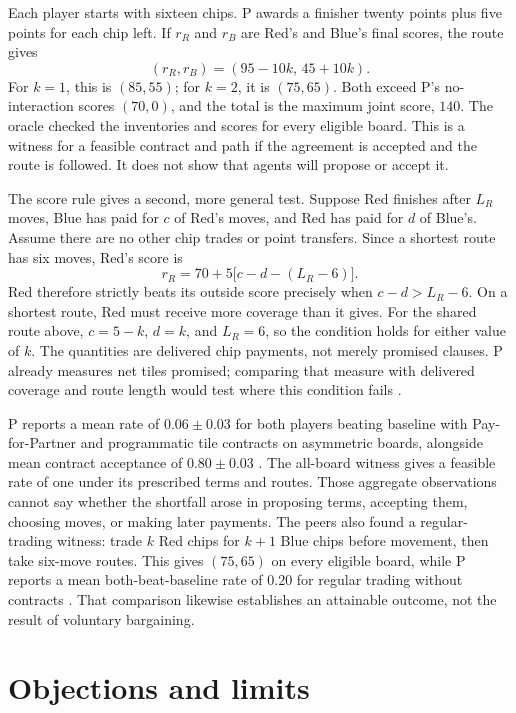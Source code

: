 \documentclass{article}
\begin{document}
Each player starts with sixteen chips. P awards a finisher twenty points plus five points for each
chip left. If \(r_R\) and \(r_B\) are Red's and Blue's final scores, the route gives
\[
(r_R,r_B)=(95-10k,\,45+10k).
\]
For \(k=1\), this is \((85,55)\); for \(k=2\), it is \((75,65)\). Both exceed P's no-interaction
scores \((70,0)\), and the total is the maximum joint score, \(140\). The oracle checked the
inventories and scores for every eligible board. This is a witness for a feasible contract and path
if the agreement is accepted and the route is followed. It does not show that agents will propose or
accept it.

The score rule gives a second, more general test. Suppose Red finishes after \(L_R\) moves, Blue has
paid for \(c\) of Red's moves, and Red has paid for \(d\) of Blue's. Assume there are no other chip
trades or point transfers. Since a shortest route has six moves, Red's score is
\[
r_R=70+5\bigl[c-d-(L_R-6)\bigr].
\]
Red therefore strictly beats its outside score precisely when \(c-d>L_R-6\). On a shortest route,
Red must receive more coverage than it gives. For the shared route above, \(c=5-k\), \(d=k\), and
\(L_R=6\), so the condition holds for either value of \(k\). The quantities are delivered chip
payments, not merely promised clauses. P already measures net tiles promised; comparing that measure
with delivered coverage and route length would test where this condition fails \cite{P}.

P reports a mean rate of \(0.06\pm0.03\) for both players beating baseline with Pay-for-Partner and
programmatic tile contracts on asymmetric boards, alongside mean contract acceptance of
\(0.80\pm0.03\) \cite{P}. The all-board witness gives a feasible rate of one under its prescribed
terms and routes. Those aggregate observations cannot say whether the shortfall arose in proposing
terms, accepting them, choosing moves, or making later payments. The peers also found a
regular-trading witness: trade \(k\) Red chips for \(k+1\) Blue chips before movement, then take
six-move routes. This gives \((75,65)\) on every eligible board, while P reports a mean
both-beat-baseline rate of \(0.20\) for regular trading without contracts \cite{P}. That comparison
likewise establishes an attainable outcome, not the result of voluntary bargaining.

\section{Objections and limits}
\end{document}
